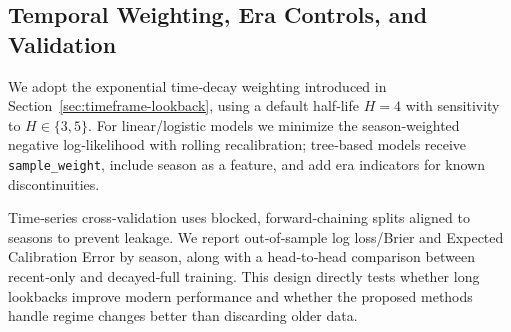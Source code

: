 \subsection{Temporal Weighting, Era Controls, and Validation}
We adopt the exponential time‑decay weighting introduced in Section~\ref{sec:timeframe-lookback}, using a default half‑life $H=4$ with sensitivity to $H\in\{3,5\}$. For linear/logistic models we minimize the season‑weighted negative log‑likelihood with rolling recalibration; tree‑based models receive \texttt{sample\_weight}, include season as a feature, and add era indicators for known discontinuities.

Time‑series cross‑validation uses blocked, forward‑chaining splits aligned to seasons to prevent leakage. We report out‑of‑sample log loss/Brier and Expected Calibration Error by season, along with a head‑to‑head comparison between recent‑only and decayed‑full training. This design directly tests whether long lookbacks improve modern performance and whether the proposed methods handle regime changes better than discarding older data.


